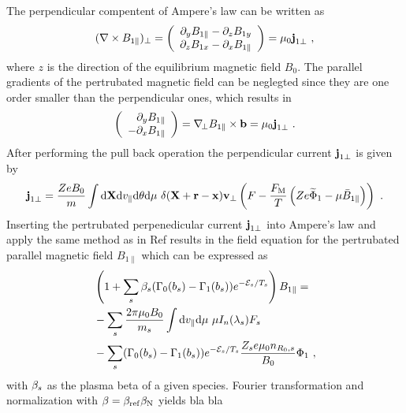 The perpendicular compentent of Ampere's law can be written as 
\begin{gather}
	(\nabla \times B_{1\parallel})_\perp = \left( \begin{array}{c} \partial_y B_{1 \parallel} - \partial_z B_{1 y} \\ \partial_z B_{1x} - \partial_x B_{1 \parallel} \end{array} \right) = \mu_0 \boldsymbol{\mathbf{j}}_{1 \perp}~,
	\label{eq:perpendicularAmpereLawLocal}
\end{gather}
where $z$ is the direction of the equilibrium magnetic field $B_0$. The parallel gradients of the pertrubated magnetic field can be neglegted since they are one order smaller than the perpendicular ones, which results in
\begin{gather}
	\left( \begin{array}{r} \partial_y B_{1 \parallel} \\ - \partial_x B_{1 \parallel} \end{array} \right) = \nabla_{\!\perp} B_{1\parallel} \times \boldsymbol{\mathbf{b}} = \mu_0 \boldsymbol{\mathbf{j}}_{1 \perp}~.
\end{gather}
After performing the pull back operation the perpendicular current $\boldsymbol{\mathbf{j}}_{1\perp}$ is given by 
\begin{gather}
		\boldsymbol{\mathbf{j}}_{1\perp} = \frac{Ze B_0}{m} \int \mathrm{d}\boldsymbol{\mathbf{X}}\mathrm{d}v_\parallel\mathrm{d}\theta\mathrm{d}\mu ~ \delta(\boldsymbol{\mathbf{X}} + \boldsymbol{\mathbf{r}} - \boldsymbol{\mathbf{x}}) \boldsymbol{\mathbf{v}}_\perp \left(F - \frac{F_\mathrm{M}}{T}\left(Ze \widetilde{\Phi}_1 - \mu \bar{B}_{1\parallel}\right) \right) ~.
	\label{eq:perpendicularCurrentPullbackLocal}
\end{gather}
Inserting the pertrubated perpenedicular current $\boldsymbol{\mathbf{j}}_{1 \perp}$ into Ampere's law and apply the same method as in Ref  results in the field equation for the pertrubated parallel magnetic field $B_{1\parallel}$ which can be expressed as
\begin{gather}
    \begin{aligned}
        &\left(1 + \sum_s \beta_s (\Gamma_0(b_s) - \Gamma_1(b_s)) e^{-\mathcal{E}_s/T_s}\right) B_{1\parallel} = \\
	    &- \sum_s \frac{2\pi \mu_0 B_0}{m_s} \int \mathrm{d}v_\parallel\mathrm{d}\mu ~ \mu I_n(\lambda_s) F_s  \\
        &- \sum_s (\Gamma_0(b_s) - \Gamma_1(b_s))e^{-\mathcal{E}_s/T_s} \frac{Z_se \mu_0 n_{R_0,s}}{B_0} \Phi_1 ~,
    \end{aligned}
    \label{eq:fieldMagneticLocal}
\end{gather}
with $\beta_s$ as the plasma beta of a given species. Fourier transformation and normalization with $\beta = \beta_\mathrm{ref} \beta_\mathrm{N}$ yields bla bla 
